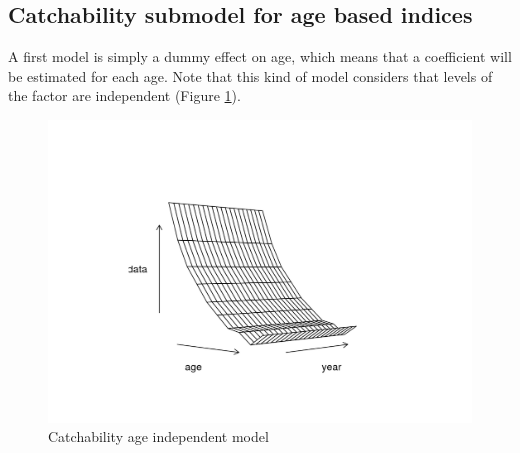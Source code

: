 \documentclass[
]{book}
\newenvironment{Shaded}{\begin{snugshade}}{\end{snugshade}}
\newcommand{\AttributeTok}[1]{\textcolor[rgb]{0.13,0.29,0.53}{#1}}
\newcommand{\DecValTok}[1]{\textcolor[rgb]{0.00,0.00,0.81}{#1}}
\newcommand{\FunctionTok}[1]{\textcolor[rgb]{0.13,0.29,0.53}{\textbf{#1}}}
\newcommand{\NormalTok}[1]{#1}
\newcommand{\OtherTok}[1]{\textcolor[rgb]{0.56,0.35,0.01}{#1}}
\newcommand{\SpecialCharTok}[1]{\textcolor[rgb]{0.81,0.36,0.00}{\textbf{#1}}}
\newcommand{\StringTok}[1]{\textcolor[rgb]{0.31,0.60,0.02}{#1}}
\begin{document}
\hypertarget{catchability-submodel-for-age-based-indices}{%
\subsection{Catchability submodel for age based indices}\label{catchability-submodel-for-age-based-indices}}

A first model is simply a dummy effect on age, which means that a coefficient will be estimated for each age. Note that this kind of model considers that levels of the factor are independent (Figure \ref{fig:dummyage}).

\begin{Shaded}
\end{Shaded}

\begin{figure}
\centering
\includegraphics{_bookdown_files/_main_files/figure-html/dummyage-1.png}
\caption{\label{fig:dummyage}Catchability age independent model}
\end{figure}
\end{document}
